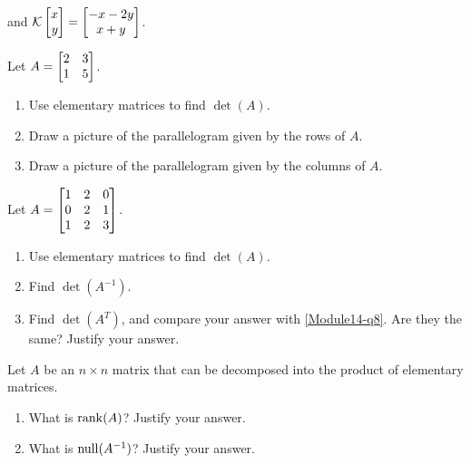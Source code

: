 \begin{exercises}
\begin{problist}
\begin{enumerate}
			and $\mathcal K\mat{x\\y}=\matc{-x-2y\\x+y}$.
        \end{enumerate}
        
        \prob Let $A=\mat{2&3\\1&5}$.
        \begin{enumerate}
            \item   Use elementary matrices to find $\det(A)$.
            \item   Draw a picture of the parallelogram given by the rows of $A$.
			\item  	Draw a picture of the parallelogram given by the columns of $A$.
		\end{enumerate}
        
        \prob Let $A=\mat{1&2&0\\0&2&1\\1&2&3}$.
        \begin{enumerate}
			\item \label{Module14-q8}   Use elementary matrices to find $\det(A)$.
			\item  	Find $\det(A^{-1})$.
			\item   Find $\det(A^{T})$, and compare your answer with \ref{Module14-q8}. Are they the same? Justify your answer.
        \end{enumerate}
        
        \prob Let $A$ be an $n \times n$ matrix that can be decomposed into the product of elementary matrices. 
        \begin{enumerate}
			\item   What is $\operatorname{rank}(A)$?         Justify your answer.
			\item  	What is $\operatorname{null}(A^{-1})$?         Justify your answer.
        \end{enumerate}
		
	\end{problist}
\end{exercises}

